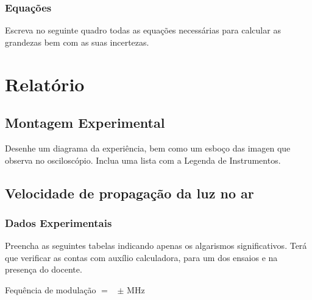 \documentclass[a4paper,12pt]{article}  %
\begin{document}



\subsubsection{\sf Equações }
Escreva no seguinte quadro todas as equações necessárias para calcular as grandezas bem com as suas incertezas.
\begin{center}
\framebox[15cm]{\rule{0pt}{6.5cm}}
\end{center}


\section{\sf Relatório}
\subsection{\sf Montagem Experimental}
Desenhe um diagrama da experiência, bem como um esboço das imagen que observa no osciloscópio. Inclua uma lista com a Legenda de Instrumentos.

\begin{center}
\framebox[18cm]{\rule{0pt}{6.5cm}}
\end{center}

\subsection{\sf Velocidade de propagação da luz no ar}%
\subsubsection{\sf Dados Experimentais}\label{sec:dados}
Preencha as seguintes tabelas indicando  apenas os algarismos significativos. 
Terá que verificar as contas com auxílio calculadora, para um dos ensaios e na presença do docente.


\noindent  Fequência de modulação $=$~\underline{\makebox[1cm][r]{~}} $\pm$ \underline{\makebox[1cm][r]{~}} MHz %
\end{document}
